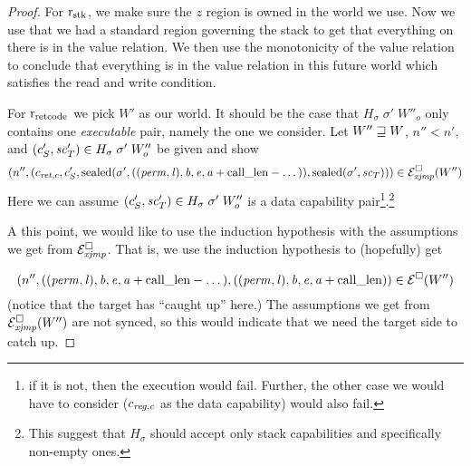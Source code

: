 \documentclass[a4paper]{article}
\begin{document}
\begin{proof}
For $\rstk$, we make sure the $z$ region is owned in the world we use. Now we use that we had a standard region governing the stack to get that everything on there is in the value relation. We then use the monotonicity of the value relation to conclude that everything is in the value relation in this future world which satisfies the read and write condition.

For $\rretc$ we pick $W'$ as our world. It should be the case that $H_\sigma \; \sigma' \; W''_o$ only contains one \emph{executable} pair, namely the one we consider. Let $W'' \future W$, $n''<n'$, and $(c_S',\vsc_T') \in H_\sigma \; \sigma' \; W''_o$ be given and show
\[
  \npair[n'']{(c_{\ret,c},c_S',\sealed{\sigma',((\perm,\lin),\baddr,\eaddr,\aaddr+\calllen-\dots)},\sealed{\sigma',\vsc_T})} \in \lrexj(W'')
\]
Here we can assume $(c_S',\vsc_T') \in H_\sigma \; \sigma' \;W''_o$ is a data capability pair\footnote{if it is not, then the execution would fail. Further, the other case we would have to consider ($c_{\reg,c}$ as the data capability) would also fail.}.\footnote{{\color{red}This suggest that $H_\sigma$ should accept only stack capabilities and specifically non-empty ones.}}

{\color{DarkRed}
  A this point, we would like to use the induction hypothesis with the assumptions we get from $\lrexj$. That is, we use the induction hypothesis to (hopefully) get

\[
  \npair[n'']{((\perm,\lin),\baddr,\eaddr,\aaddr+\calllen-\dots),((\perm,\lin),\baddr,\eaddr,\aaddr+\calllen)} \in \lre(W'')
\]
(notice that the target has ``caught up'' here.) The assumptions we get from $\lrexj(W'')$ are not synced, so this would indicate that we need the target side to catch up.
}


\end{proof}
\end{document}
